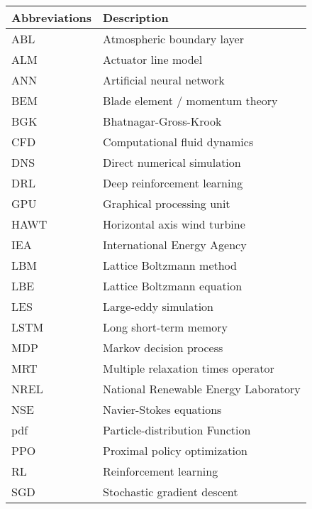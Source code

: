 \vspace{0.5cm}
\newpage
\begin{longtable}{p{7cm}p{7cm}}
	Abbreviations	& Description\\ \hline
	ABL				& Atmospheric boundary layer \\
	ALM				& Actuator line model \\
	ANN				& Artificial neural network \\
	BEM				& Blade element / momentum theory \\
	BGK        		& Bhatnagar-Gross-Krook \\
	CFD				& Computational fluid dynamics \\
	DNS         	& Direct numerical simulation \\
	DRL				& Deep reinforcement learning \\
	GPU				& Graphical processing unit \\
	HAWT			& Horizontal axis wind turbine \\
	IEA				& International Energy Agency \\
	LBM         	& Lattice Boltzmann method \\
	LBE         	& Lattice Boltzmann equation \\
	LES         	& Large-eddy simulation \\
	LSTM			& Long short-term memory \\
	MDP				& Markov decision process \\
	MRT         	& Multiple relaxation times operator \\
	NREL			& National Renewable Energy Laboratory \\
	NSE         	& Navier-Stokes equations \\
	pdf         	& Particle-distribution Function \\
	PPO				& Proximal policy optimization \\
	RL				& Reinforcement learning \\
	SGD				& Stochastic gradient descent 
\end{longtable}
